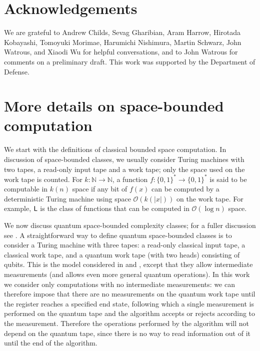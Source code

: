 \documentclass[11pt]{article}
\theoremstyle{definition}
\theoremstyle{remark}
\newcommand\Logspace{{\sf{L}}}
\newcommand\bigoh{\mathcal{O}}
\begin{document}
\section{Acknowledgements}
We are grateful to Andrew Childs, Sevag Gharibian, Aram Harrow, Hirotada Kobayashi, Tomoyuki Morimae, Harumichi Nishimura, Martin Schwarz, John Watrous, and Xiaodi Wu for helpful conversations, and to John Watrous for comments on a preliminary draft. This work was supported by the Department of Defense.

 


\appendix

\section{More details on space-bounded computation}\label{app: space bounded}
We start with the definitions of classical bounded space computation. In discussion of space-bounded classes, we usually consider Turing machines with two tapes, a read-only input tape and a work tape; only the space used on the work tape is counted. For $k:\mathbb{N}\rightarrow\mathbb{N}$, a function $f:\{0,1\}^{*}\rightarrow\{0,1\}^*$ is said to be computable in $k(n)$ space if any bit of $f(x)$ can be computed by a deterministic Turing machine using space $\bigoh(k(|x|))$ on the work tape.  For example, $\Logspace$ is the class of functions that can be computed in $\bigoh(\log{n})$ space.

We now discuss quantum space-bounded complexity classes; for a fuller discussion see \cite{Watrous09}. A straightforward way to define quantum space-bounded classes is to consider a Turing machine with three tapes: a read-only classical input tape, a classical work tape, and a quantum work tape (with two heads) consisting of qubits. This is the model considered in \cite{tashma} and \cite{Watrous03}, except that they allow intermediate measurements (and \cite{Watrous03} allows even more general quantum operations). In this work we consider only computations with no intermediate measurements: we can therefore impose that there are no measurements on the quantum work tape until the register reaches a specified end state, following which a single measurement is performed on the quantum tape and the algorithm accepts or rejects according to the measurement. Therefore the operations performed by the algorithm will not depend on the quantum tape, since there is no way to read information out of it until the end of the algorithm.
\end{document}
